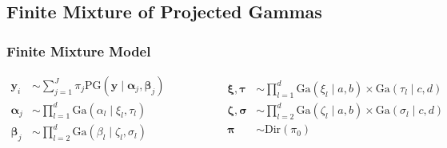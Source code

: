\documentclass[aspectratio=169]{beamer}
\begin{document}
\subsection*{Finite Mixture of Projected Gammas}
\begin{frame}
  \frametitle{Finite Mixture Model}
  \begin{equation*}
    \begin{aligned}
      \bm{ y}_i &\sim \sum_{j = 1}^J\pi_j\text{PG}\left(\bm{ y}\mid \bm{ \alpha}_j, \bm{ \beta}_j\right)\\
      \bm{ \alpha}_j &\sim {\textstyle \prod}_{l = 1}^d \text{Ga}\left(\alpha_l\mid\xi_l,\tau_l\right)\\
      \bm{ \beta}_j &\sim {\textstyle \prod}_{l = 2}^d \text{Ga}\left(\beta_l\mid\zeta_l,\sigma_l\right)
    \end{aligned}
    \hspace{2cm}
    \begin{aligned}
      \bm{ \xi},\bm{\tau} &\sim {\textstyle \prod}_{l = 1}^d \text{Ga}(\xi_l\mid a,b)
                \times \text{Ga}(\tau_l\mid c,d)\\
      \bm{ \zeta},\bm{\sigma} &\sim {\textstyle\prod}_{l = 2}^d\text{Ga}(\zeta_l \mid a,b)
              \times \text{Ga}(\sigma_l\mid c,d)\\
      \bm{ \pi} &\sim \text{Dir}(\pi_0)
    \end{aligned}
  \end{equation*}
\end{frame} %
\end{document}

